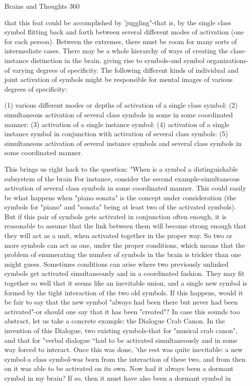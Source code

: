 Brains and Thoughts                                                                     360

  that this feat could be accomplished by 'juggling"-that is, by the single class symbol
flitting back and forth between several different modes of activation (one for each
person).
  Between the extremes, there must be room for many sorts of intermediate cases. There
may be a whole hierarchy of ways of creating the class-instance distinction in the brain,
giving rise to symbols-and symbol organizations-of varying degrees of specificity. The
following different kinds of individual and joint activation of symbols might be
responsible for mental images of various degrees of specificity:

  (1) various different modes or depths of activation of a single class symbol:
  (2) simultaneous activation of several class symbols in some in some coordinated
       manner:
  (3) activation of a single instance symbol:
  (4) activation of a single instance symbol in conjunction with activation of several
       class symbols:
  (5) simultaneous activation of several instance symbols and several class symbols
       in some coordinated manner.

  This brings us right hack to the question: "When is a symbol a distinguishable
subsystem of the brain For instance, consider the second example-simultaneous
activation of several class symbols in some coordinated manner. This could easily be
what happens when "piano sonata" is the concept under consideration (the symbols for
"piano" and "sonata" being at least two of the activated symbols). But if this pair of
symbols gets activated in conjunction often enough, it is reasonable to assume that the
link between them will become strong enough that they will act as a unit, when activated
together in the proper way. So two or more symbols can act as one, under the proper
conditions, which means that the problem of enumerating the number of symbols in the
brain is trickier than one might guess.
  Sometimes conditions can arise where two previously unlinked symbols get activated
simultaneously and in a coordinated fashion. They may fit together so well that it seems
like an inevitable union, and a single new symbol is formed by the tight interaction of the
two old symbols. If this happens, would it be fair to say that the new symbol "always had
been there but never had been activated"-or should one say that it has been "created"?
  In case this sounds too abstract, let us take a concrete example: the Dialogue Crab
Canon. In the invention of this Dialogue, two existing symbols-that for "musical crab
canon", and that for "verbal dialogue “had to be activated simultaneously and in some
way forced to interact. Once this was done, 'the rest was quite inevitable: a new symbol-a
class symbol-was born from the interaction of these two, and from then on it was able to
be activated on its own. Now had it always been a dormant symbol in my brain? If so,
then it must have also been a dormant symbol in




